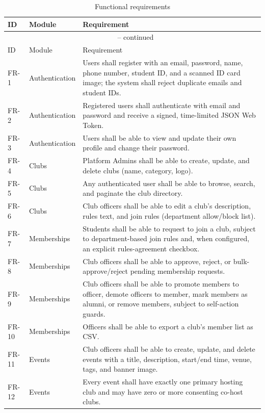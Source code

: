 \documentclass[12pt,oneside]{book}
\begin{document}
\begin{longtable}{@{}p{1.3cm}p{2.6cm}p{10.3cm}@{}}
\caption{Functional requirements}\label{tab:3.2}\\
\toprule
ID & Module & Requirement \\
\midrule
\endfirsthead
\multicolumn{3}{c}{{\tablename\ \thetable{} -- continued}} \\
\toprule
ID & Module & Requirement \\
\midrule
\endhead
\bottomrule
\endfoot
FR-1 & Authentication & Users shall register with an email, password, name, phone number, student ID, and a scanned ID card image; the system shall reject duplicate emails and student IDs. \\
FR-2 & Authentication & Registered users shall authenticate with email and password and receive a signed, time-limited JSON Web Token. \\
FR-3 & Authentication & Users shall be able to view and update their own profile and change their password. \\
FR-4 & Clubs & Platform Admins shall be able to create, update, and delete clubs (name, category, logo). \\
FR-5 & Clubs & Any authenticated user shall be able to browse, search, and paginate the club directory. \\
FR-6 & Clubs & Club officers shall be able to edit a club's description, rules text, and join rules (department allow/block list). \\
FR-7 & Memberships & Students shall be able to request to join a club, subject to department-based join rules and, when configured, an explicit rules-agreement checkbox. \\
FR-8 & Memberships & Club officers shall be able to approve, reject, or bulk-approve/reject pending membership requests. \\
FR-9 & Memberships & Club officers shall be able to promote members to officer, demote officers to member, mark members as alumni, or remove members, subject to self-action guards. \\
FR-10 & Memberships & Officers shall be able to export a club's member list as CSV. \\
FR-11 & Events & Club officers shall be able to create, update, and delete events with a title, description, start/end time, venue, tags, and banner image. \\
FR-12 & Events & Every event shall have exactly one primary hosting club and may have zero or more consenting co-host clubs. \\

\end{longtable}
\end{document}
